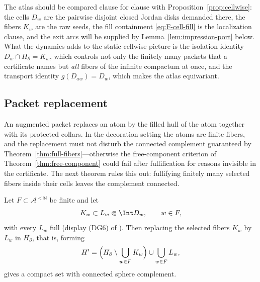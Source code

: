 The atlas should be compared clause for clause with
Proposition~\ref{prop:cellwise}: the cells $D_w$ are the pairwise
disjoint closed Jordan disks demanded there, the fibers $K_w$ are the
raw seeds, the fill containment \eqref{eq:F-cell-fill} is the
localization clause, and the exit arcs will be supplied by
Lemma~\ref{lem:impression-port} below.  What the dynamics adds to the
static cellwise picture is the isolation identity
$D_w\cap H_\partial=K_w$, which controls not only the finitely many
packets that a certificate names but \emph{all} fibers of the infinite
compactum at once, and the transport identity $g(D_{aw})=D_w$, which
makes the atlas equivariant.

\subsection{Packet replacement}\label{subsec:F-replacement}

An augmented packet replaces an atom by the filled hull of the atom
together with its protected collars.  In the decoration setting the atoms
are finite fibers, and the replacement must not disturb the connected
complement guaranteed by Theorem~\ref{thm:full-fibers}---otherwise the
free-component criterion of Theorem~\ref{thm:free-component} could fail
after fullification for reasons invisible in the certificate.  The next
theorem rules this out: fullifying finitely many selected fibers inside
their cells leaves the complement connected.

\begin{theorem}\label{thm:packet-replacement}
Let $F\subset\mathcal A^{<\mathbb N}$ be finite and let
\begin{equation}\label{eq:F-replacement}
K_w\subset L_w\Subset\Int D_w,\qquad w\in F,
\end{equation}
with every $L_w$ full (display (DG6) of \cite{MWman}).  Then replacing
the selected fibers $K_w$ by $L_w$ in $H_\partial$, that is, forming
\[
H'
=\Bigl(H_\partial\setminus\bigcup_{w\in F}K_w\Bigr)
\cup\bigcup_{w\in F}L_w ,
\]
gives a compact set with connected sphere complement.
\end{theorem}

